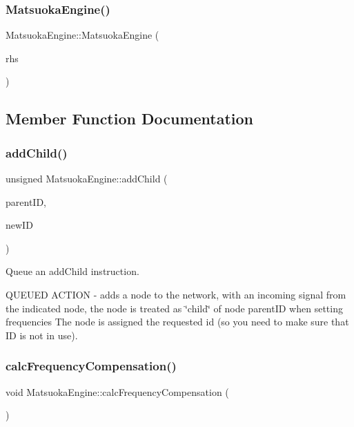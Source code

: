 \subsubsection{\texorpdfstring{Matsuoka\+Engine()}{MatsuokaEngine()}\hspace{0.1cm}{\footnotesize\ttfamily [3/3]}}
{\footnotesize\ttfamily Matsuoka\+Engine\+::\+Matsuoka\+Engine (\begin{DoxyParamCaption}\item[{const \mbox{\hyperlink{classMatsuokaEngine}{Matsuoka\+Engine}} \&}]{rhs }\end{DoxyParamCaption})}



\subsection{Member Function Documentation}
\mbox{\label{classMatsuokaEngine_a2e441b2259ae96759bf300c1f2af4ab1}} 
\subsubsection{\texorpdfstring{add\+Child()}{addChild()}}
{\footnotesize\ttfamily unsigned Matsuoka\+Engine\+::add\+Child (\begin{DoxyParamCaption}\item[{unsigned}]{parent\+ID,  }\item[{unsigned}]{new\+ID }\end{DoxyParamCaption})}



Queue an add\+Child instruction. 

Q\+U\+E\+U\+ED A\+C\+T\+I\+ON -\/ adds a node to the network, with an incoming signal from the indicated node, the node is treated as \char`\"{}child\char`\"{} of node parent\+ID when setting frequencies The node is assigned the requested id (so you need to make sure that ID is not in use). \mbox{\label{classMatsuokaEngine_a7b665074cd1e6fddc875c7d36b305f66}} 
\subsubsection{\texorpdfstring{calc\+Frequency\+Compensation()}{calcFrequencyCompensation()}}
{\footnotesize\ttfamily void Matsuoka\+Engine\+::calc\+Frequency\+Compensation (\begin{DoxyParamCaption}{ }\end{DoxyParamCaption})}

